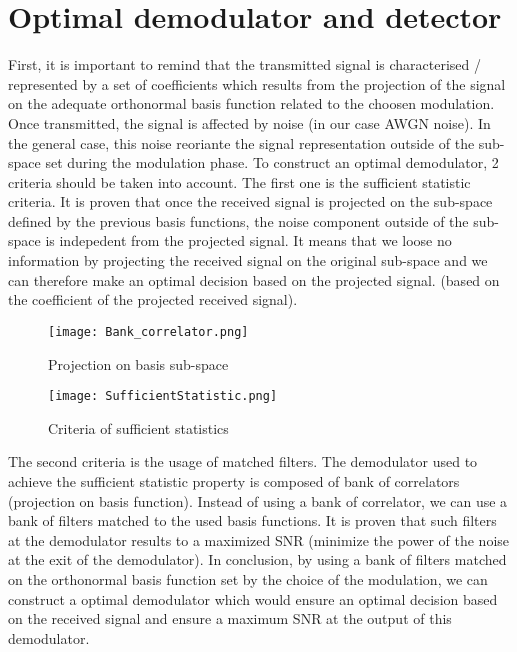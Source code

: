 \section{Optimal demodulator and detector}

First, it is important to remind that the transmitted signal is characterised / represented by a set of coefficients which results from the projection
 of the signal on the adequate orthonormal basis function related to the choosen modulation.
 Once transmitted, the signal is affected by noise (in our case AWGN noise).  In the general case, this noise reoriante the signal representation outside of the sub-space set during the modulation phase.
To construct an optimal demodulator, 2 criteria should be taken into account.  The first one is the sufficient statistic criteria.  It is proven that once the received signal
is projected on the sub-space defined by the previous basis functions, the noise component outside of the sub-space is indepedent from the projected signal.
It means that we loose no information by projecting the received signal on the original sub-space and we can therefore make an optimal decision based on the projected signal.
(based on the coefficient of the projected received signal).

\begin{figure}[H]
    \centering
    \texttt{[image: Bank\_correlator.png]}
    \caption{Projection on basis sub-space}
    \label{fig:Bank_correlator}
\end{figure}

\begin{figure}[H]
    \centering
    \texttt{[image: SufficientStatistic.png]}
    \caption{Criteria of sufficient statistics}
    \label{fig:Sufficientstatistic}
\end{figure}

The second criteria is the usage of matched filters. The demodulator used to achieve the sufficient statistic property is composed of bank of correlators (projection on basis function).
Instead of using a bank of correlator, we can use a bank of filters matched to the used basis functions.  It is proven that such filters at the demodulator results to
 a maximized SNR (minimize the power of the noise at the exit of the demodulator).
In conclusion, by using a bank of filters matched on the orthonormal basis function set by the choice of the modulation, we can construct a optimal demodulator which
 would ensure an optimal decision based on the received signal and ensure a maximum SNR at the output of this demodulator.

